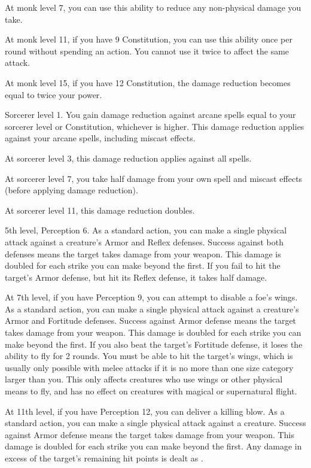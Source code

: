     At monk level 7, you can use this ability to reduce any non-physical damage you take.

    At monk level 11, if you have 9 Constitution, you can use this ability once per round without spending an action.
    You cannot use it twice to affect the same attack.

    At monk level 15, if you have 12 Constitution, the damage reduction becomes equal to twice your \ki power.

    \featpre Sorcerer level 1.
    \featben You gain damage reduction against arcane spells equal to your sorcerer level or Constitution, whichever is higher.
    This damage reduction applies against your arcane spells, including miscast effects.

    At sorcerer level 3, this damage reduction applies against all spells.

    At sorcerer level 7, you take half damage from your own spell and miscast effects (before applying damage reduction).

    At sorcerer level 11, this damage reduction doubles.

    \featpre 5th level, Perception 6.
    \featben As a standard action, you can make a single physical attack against a creature's Armor and Reflex defenses.
    Success against both defenses means the target takes damage from your weapon.
    This damage is doubled for each strike you can make beyond the first.
    If you fail to hit the target's Armor defense, but hit its Reflex defense, it takes half damage.

    At 7th level, if you have Perception 9, you can attempt to disable a foe's wings.
    As a standard action, you can make a single physical attack against a creature's Armor and Fortitude defenses.
    Success against Armor defense means the target takes damage from your weapon.
    This damage is doubled for each strike you can make beyond the first.
    If you also beat the target's Fortitude defense, it loses the ability to fly for 2 rounds.
    You must be able to hit the target's wings, which is usually only possible with melee attacks if it is no more than one size category larger than you.
    This only affects creatures who use wings or other physical means to fly, and has no effect on creatures with magical or supernatural flight.

    At 11th level, if you have Perception 12, you can deliver a killing blow.
    As a standard action, you can make a single physical attack against a creature.
    Success against Armor defense means the target takes damage from your weapon.
    This damage is doubled for each strike you can make beyond the first.
    Any damage in excess of the target's remaining hit points is dealt as .

